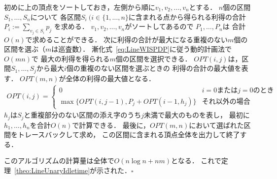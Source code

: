 初めに{\graphLine}上の頂点をソートしておき，左側から順に$v_1, v_2, \ldots, v_n$とする．
$n$個の区間$S_1, \ldots, S_n$について
各区間$S_i\ (i \in \{ 1, \ldots, n \}$に含まれる点から得られる利得の合計
$P_i := \sum_{v_j \in S_i} p_j$
を求める．
$v_1, v_2, \ldots, v_n$がソートしてあるので
$P_1, \ldots, P_n$は
合計$O(n)$で求めることができる．
次に利得の合計が最大になる重複のない$m$個の区間を選ぶ（$m$は巡査数）．
漸化式~\eqref{eq:LineWISPDP}に従う動的計画法で
$O(mn)$で
最大の利得を得られる$m$個の区間を選択できる．
$OPT(i,j)$は，区間$S_1, \ldots, S_j$から最大$i$個の重複のない区間を選ぶときの
利得の合計の最大値を表す．
$OPT(m,n)$が全体の利得の最大値となる．
\begin{align}
  \label{eq:LineWISPDP}
  OPT(i,j) = 
  \begin{cases}
    0 & \text{$i = 0$または$j = 0$のとき} \\
    \max \{
      OPT(i, j - 1), 
      P_j + OPT(i - 1, h_j)
    \}
    & \text{それ以外の場合}
  \end{cases}
\end{align}
$h_j$は$S_j$と重複部分のない区間の添え字のうち$j$未満で最大のものを表し，
最初に$h_1, \ldots, h_n$を合計$O(n)$で計算できる．
最後に，$OPT(m,n)$において選ばれた区間をトレースバックして求め，
この区間に含まれる頂点全体を出力して終了する．

このアルゴリズムの計算量は全体で$O(n \log n + nm)$となる．
これで定理~\ref{theo:LineUnaryIdletime}が示された．$\square$


